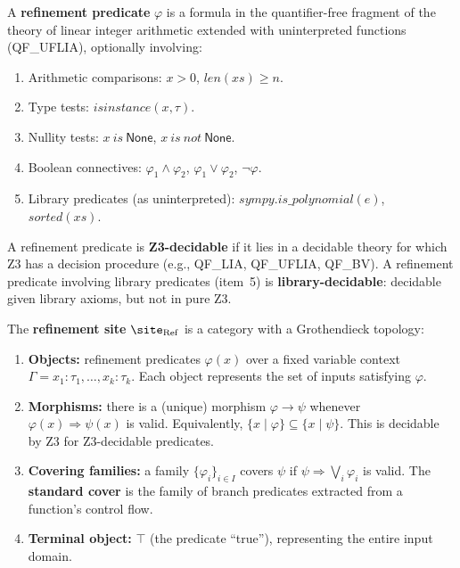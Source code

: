 \begin{definition}
\label{def:refinement-pred}
A \textbf{refinement predicate} $\varphi$ is a formula in the
quantifier-free fragment of the theory of linear integer arithmetic
extended with uninterpreted functions (QF\_UFLIA), optionally
involving:
\begin{enumerate}
\item Arithmetic comparisons: $x > 0$, $\mathit{len}(xs) \geq n$.
\item Type tests: $\mathit{isinstance}(x, \tau)$.
\item Nullity tests: $x\ \mathit{is}\ \mathsf{None}$,
  $x\ \mathit{is\ not}\ \mathsf{None}$.
\item Boolean connectives: $\varphi_1 \wedge \varphi_2$,
  $\varphi_1 \vee \varphi_2$, $\neg \varphi$.
\item Library predicates (as uninterpreted):
  $\mathit{sympy.is\_polynomial}(e)$, $\mathit{sorted}(xs)$.
\end{enumerate}
A refinement predicate is \textbf{Z3-decidable} if it lies in a
decidable theory for which Z3 has a decision procedure (e.g.,
QF\_LIA, QF\_UFLIA, QF\_BV).  A refinement predicate involving
library predicates (item~5) is \textbf{library-decidable}: decidable
given library axioms, but not in pure Z3.
\end{definition}

\begin{definition}
\label{def:refinement-site}
The \textbf{refinement site} $\site_\mathrm{Ref}$ is a category
with a Grothendieck topology:
\begin{enumerate}
\item \textbf{Objects:} refinement predicates $\varphi(x)$ over a
  fixed variable context $\Gamma = x_1 : \tau_1, \ldots, x_k : \tau_k$.
  Each object represents the set of inputs satisfying $\varphi$.

\item \textbf{Morphisms:} there is a (unique) morphism
  $\varphi \to \psi$ whenever $\varphi(x) \Rightarrow \psi(x)$ is
  valid.  Equivalently, $\{x \mid \varphi\} \subseteq \{x \mid \psi\}$.
  This is decidable by Z3 for Z3-decidable predicates.

\item \textbf{Covering families:} a family $\{\varphi_i\}_{i \in I}$
  covers $\psi$ if $\psi \Rightarrow \bigvee_i \varphi_i$ is valid.
  The \textbf{standard cover} is the family of branch predicates
  extracted from a function's control flow.

\item \textbf{Terminal object:} $\top$ (the predicate ``true''),
  representing the entire input domain.
\end{enumerate}
\end{definition}

